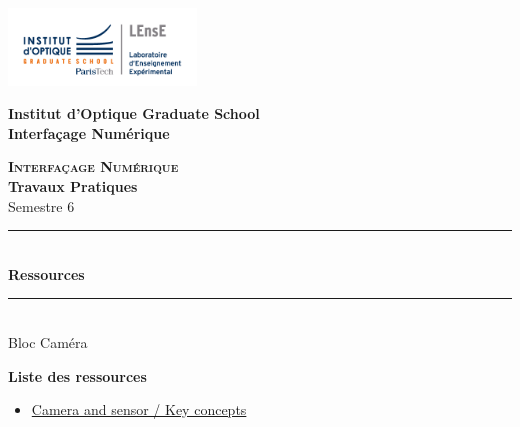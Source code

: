 \documentclass[a4paper,11pt,titlepage]{article} %
\begin{document}
\newpage
\begin{center}
	\begin{minipage}{2.5cm}
	\begin{center}
		\includegraphics[width=5cm]{images/Logo-LEnsE.png}
	\end{center}
\end{minipage}\hfill
\begin{minipage}{10cm}
	\begin{center}
	\textbf{Institut d'Optique Graduate School }\\[0.1cm]
    \textbf{Interfaçage Numérique}


	\end{center}
\end{minipage}\hfill


\vspace{2cm}


{\Large \bfseries \textsc{Interfaçage Numérique}} \\[0.5cm]
{\large \bfseries Travaux Pratiques} \\[0.2cm]
Semestre 6

\vspace{1cm}

\rule{\linewidth}{0.4mm} \\[0.4cm]
{ \Large \bfseries\color{violet_iogs} Ressources \\[0.4cm] }
\rule{\linewidth}{0.4mm} \\[1cm]
{\large Bloc Caméra}

\end{center}

\vspace{3cm}



\textbf{\large Liste des ressources}
\begin{itemize}
	\item \hyperref[doc:image_proc]{Camera and sensor / Key concepts}
\end{itemize}

\vfill

\newpage
\strut %




\end{document}
